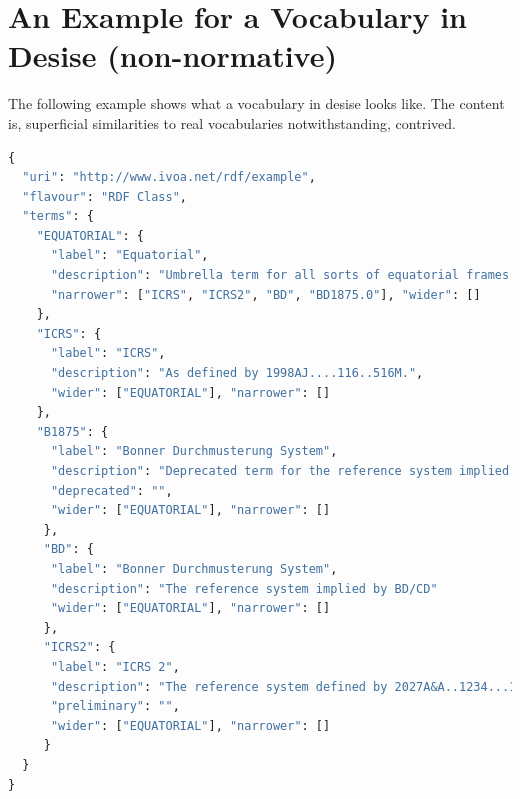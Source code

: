 \documentclass[11pt,a4paper]{ivoa}
\def\vocterm#1{\emph{\color{termcolor}#1}}
\def\vocterm{\startvocterm\realvocterm}
\def\realvocterm#1{\emph{\color{termcolor}#1}\endvocterm}
\gdef\breakablecolon{:\hskip0pt}
\gdef\startvocterm{\begingroup
  \catcode`\:=\active\let:=\breakablecolon}
\gdef\endvocterm{\endgroup}
\begin{document}


\section{An Example for a Vocabulary in Desise (non-normative)}
\label{app:desiseexample}

The following example shows what a vocabulary in desise looks like.  The
content is, superficial similarities to real vocabularies
notwithstanding, contrived.

\begin{lstlisting}[language=python]
{
  "uri": "http://www.ivoa.net/rdf/example",
  "flavour": "RDF Class",
  "terms": {
    "EQUATORIAL": {
      "label": "Equatorial",
      "description": "Umbrella term for all sorts of equatorial frames.",
      "narrower": ["ICRS", "ICRS2", "BD", "BD1875.0"], "wider": []
    },
    "ICRS": {
      "label": "ICRS",
      "description": "As defined by 1998AJ....116..516M.",
      "wider": ["EQUATORIAL"], "narrower": []
    },
    "B1875": {
      "label": "Bonner Durchmusterung System",
      "description": "Deprecated term for the reference system implied by BD/CD",
      "deprecated": "",
      "wider": ["EQUATORIAL"], "narrower": []
     },
     "BD": {
      "label": "Bonner Durchmusterung System",
      "description": "The reference system implied by BD/CD"
      "wider": ["EQUATORIAL"], "narrower": []
     },
     "ICRS2": {
      "label": "ICRS 2",
      "description": "The reference system defined by 2027A&A..1234...12B",
      "preliminary": "",
      "wider": ["EQUATORIAL"], "narrower": []
     }
  }
}
\end{lstlisting}
\end{document}

